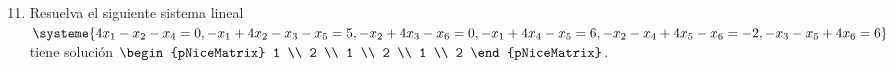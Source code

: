 \begin{frame}
	\begin{enumerate}\setcounter{enumi}{10}
		\item

		      Resuelva el siguiente sistema lineal
		      \begin{math}
			      \systeme{
			      4x_{1}-
			      x_{2}-
			      x_{4}=
			      0,
			      -x_{1}+
			      4x_{2}-
			      x_{3}-
			      x_{5}=
			      5,
			      -x_{2}+
			      4x_{3}-
			      x_{6}=
			      0,
			      -x_{1}+
			      4x_{4}-
			      x_{5}=
			      6,
			      -x_{2}-
			      x_{4}+
			      4x_{5}-
			      x_{6}=
			      -2,
			      -x_{3}-
			      x_{5}+
			      4x_{6}=
			      6
			      }
		      \end{math}
		      tiene solución
		      \begin{math}
			      \begin{pNiceMatrix}
				      1 \\
				      2 \\
				      1 \\
				      2 \\
				      1 \\
				      2
			      \end{pNiceMatrix}
		      \end{math}.


\end{enumerate}
\end{frame}
